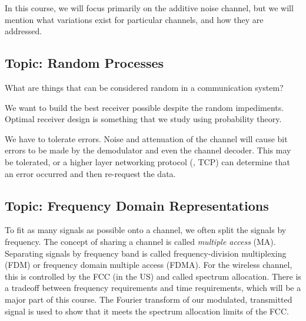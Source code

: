 In this course, we will focus primarily on the additive noise channel, but we
will mention what variations exist for particular channels, and how
they are addressed.

\subsection{Topic:  Random Processes}

What are things that can be considered random in a communication system?


We want to build the best receiver possible despite the random impediments.  Optimal
receiver design is something that we study using probability theory.

We have to tolerate errors.  Noise and attenuation of the channel
will cause bit errors to be made by the demodulator and even the
channel decoder.  This may be tolerated, or a higher layer
networking protocol (\eg, TCP) can determine that an error
occurred and then re-request the data.

\subsection{Topic:  Frequency Domain Representations}

To fit as many signals as possible onto a channel, we often split
the signals by frequency.  The concept of sharing a channel is
called \emph{multiple access} (MA).  Separating signals by frequency
band is called frequency-division multiplexing (FDM) or frequency domain multiple access (FDMA).  For the
wireless channel, this is controlled by the FCC (in the US) and
called spectrum allocation. There is a tradeoff between frequency
requirements and time requirements, which will be a major part of
this course.  The Fourier transform of our modulated, transmitted
signal is used to show that it meets the spectrum allocation limits
of the FCC.

